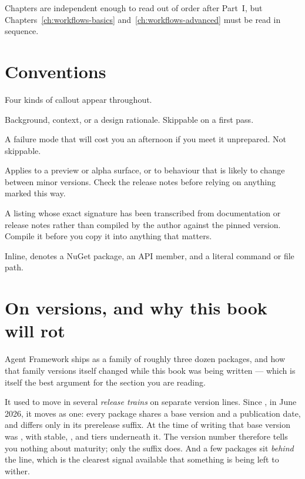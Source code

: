 Chapters are independent enough to read out of order after Part~I, but
Chapters~\ref{ch:workflows-basics} and~\ref{ch:workflows-advanced} must be read
in sequence.

\section*{Conventions}

Four kinds of callout appear throughout.

\begin{note}
Background, context, or a design rationale. Skippable on a first pass.
\end{note}

\begin{warning}
A failure mode that will cost you an afternoon if you meet it unprepared.
Not skippable.
\end{warning}

\begin{versionbox}
Applies to a preview or alpha surface, or to behaviour that is likely to change
between minor versions. Check the release notes before relying on anything
marked this way.
\end{versionbox}

\begin{verifybox}
A listing whose exact signature has been transcribed from documentation or
release notes rather than compiled by the author against the pinned version.
Compile it before you copy it into anything that matters.
\end{verifybox}

Inline,  denotes a NuGet package,  an
API member, and  a literal command or file path.

\section*{On versions, and why this book will rot}

Agent Framework ships as a family of roughly three dozen packages, and how that
family versions itself changed while this book was being written --- which is
itself the best argument for the section you are reading.

It used to move in several \emph{release trains} on separate version lines.
Since , in June 2026, it moves as one: every package shares a base
version and a publication date, and differs only in its prerelease suffix.
At the time of writing that base version was \mafcore{}, with stable,
,  and  tiers underneath it. The version
number therefore tells you nothing about maturity; only the suffix does. And a
few packages sit \emph{behind} the line, which is the clearest signal available
that something is being left to wither.

